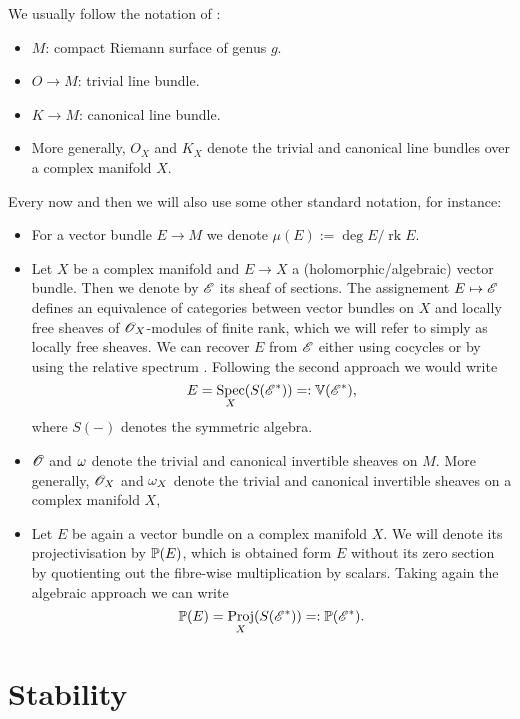 \documentclass[A4paper, 12pt, british, reqno]{amsart}
\DeclareMathOperator{\Spec}{Spec}
\DeclareMathOperator{\Proj}{Proj}
\DeclareMathOperator{\rk}{rk}
\newcommand{\dual}{^{*}}
\begin{document}
We usually follow the notation of \cite{hit87a}:
\begin{itemize}
    \item $M$: compact Riemann surface of genus $g$.
    \item $O\to M$: trivial line bundle.
    \item $K\to M$: canonical line bundle.
    \item More generally, $O_{X}$ and $K_{X}$ denote the trivial and canonical line bundles over a complex manifold $X$.
\end{itemize}
Every now and then we will also use some other standard notation, for instance:
\begin{itemize}
    \item For a vector bundle $E\to M$ we denote $\mu(E):=\deg{E}/\rk{E}$.
    \item Let $X$ be a complex manifold and $E\to X$ a (holomorphic/algebraic) vector bundle.
	Then we denote by $\E$ its sheaf of sections.
	The assignement $E\mapsto \E$ defines an equivalence of categories between vector bundles on $X$ and locally free sheaves of $\O_{X}$-modules of finite rank, which we will refer to simply as locally free sheaves.
	We can recover $E$ from $\E$ either using cocycles \cite[Lemma 4.8]{voi02} or by using the relative spectrum \cite[Exercise II.5.18]{har77}.
	Following the second approach we would write
	\[ E=\Spec_{X}(S(\E\dual))=:\V(\E\dual), \]
	where $S(-)$ denotes the symmetric algebra.
    \item $\O$ and $\w$ denote the trivial and canonical invertible sheaves on $M$.
	More generally, $\O_{X}$ and $\w_{X}$ denote the trivial and canonical invertible sheaves on a complex manifold $X$,
    \item Let $E$ be again a vector bundle on a complex manifold $X$.
	We will denote its projectivisation by $\P(E)$, which is obtained form $E$ without its zero section by quotienting out the fibre-wise multiplication by scalars.
	Taking again the algebraic approach we can write
	\[ \P(E)=\Proj_{X}(S(\E\dual))=:\P(\E\dual). \]
\end{itemize}

\section{Stability}

\end{document}
